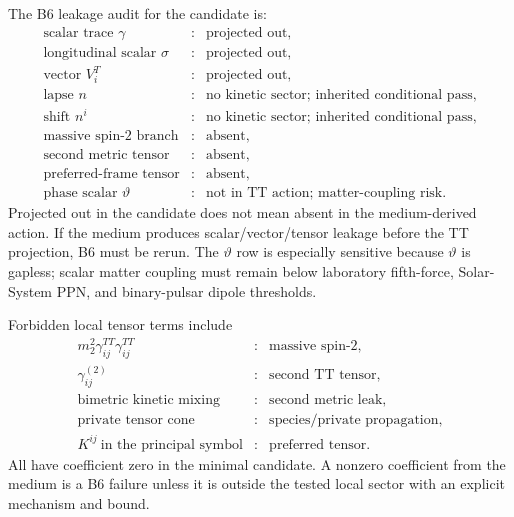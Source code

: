 \documentclass[11pt]{article}
\begin{document}
The B6 leakage audit for the candidate is:
\[
\boxed{
\begin{array}{lll}
\text{scalar trace }\gamma &:& \text{projected out},\\
\text{longitudinal scalar }\sigma &:& \text{projected out},\\
\text{vector }V_i^T &:& \text{projected out},\\
\text{lapse }n &:& \text{no kinetic sector; inherited conditional pass},\\
\text{shift }n^i &:& \text{no kinetic sector; inherited conditional pass},\\
\text{massive spin-2 branch} &:& \text{absent},\\
\text{second metric tensor} &:& \text{absent},\\
\text{preferred-frame tensor} &:& \text{absent},\\
\text{phase scalar }\vartheta &:& \text{not in TT action; matter-coupling risk}.
\end{array}}
\]
Projected out in the candidate does not mean absent in the medium-derived
action.  If the medium produces scalar/vector/tensor leakage before the TT
projection, B6 must be rerun.  The \(\vartheta\) row is especially sensitive
because \(\vartheta\) is gapless; scalar matter coupling must remain below
laboratory fifth-force, Solar-System PPN, and binary-pulsar dipole thresholds.

Forbidden local tensor terms include
\[
\boxed{
\begin{array}{lll}
m_2^2\gamma^{TT}_{ij}\gamma^{TT}_{ij} &:& \text{massive spin-2},\\
\gamma^{(2)}_{ij} &:& \text{second TT tensor},\\
\text{bimetric kinetic mixing} &:& \text{second metric leak},\\
\text{private tensor cone} &:& \text{species/private propagation},\\
K^{ij}\ \text{in the principal symbol} &:& \text{preferred tensor}.
\end{array}
}
\]
All have coefficient zero in the minimal candidate.  A nonzero coefficient
from the medium is a B6 failure unless it is outside the tested local sector
with an explicit mechanism and bound.
\end{document}
